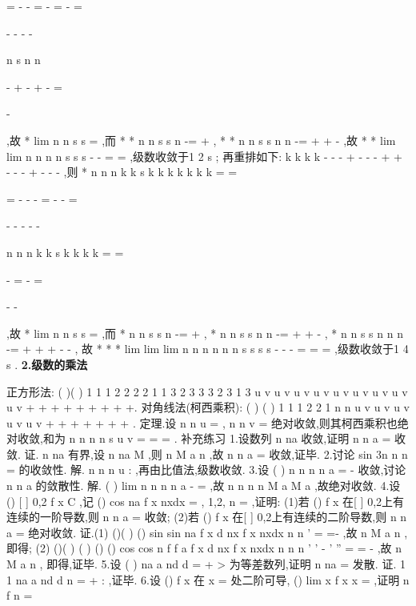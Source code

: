 =
-
-
=
-
=
-
=






-
-
-
-






\sum 
\sum 
\sum 
n
s
n
n


-
+
-
+
-
=


-


\Lambda 
,故
*
lim
n
n
s
s
\to \infty 
=
,而
*
*
n
n
s
s
n
-=
+
, 
*
*
n
n
s
s
n
n
-=
+
+
-
,故
*
*
lim
lim
n
n
n
n
s
s
s
-
-
\to \infty 
\to \infty 
=
=
,级数收敛于1
2 s ; 
再重排如下: 
k
k
k
k
-
-
-
+
-
-
-
+
+
-
-
-
+
-
-
-
\Lambda 
\Lambda ,则 
*
n
n
n
k
k
s
k
k
k
k
k
k
k
=
=




=
-
-
-
=
-
-
=




-
-
-
-
-




\sum 
\sum 
n
n
n
k
k
s
k
k
k
k
=
=




-
=
-
=




-
-




\sum 
\sum 
,故
*
lim
n
n
s
s
\to \infty 
=
,而 
*
n
n
s
s
n
-=
+
,
*
n
n
s
s
n
n
-=
+
+
-
,
*
n
n
s
s
n
n
n
-=
+
+
+
-
-
, 
故
*
*
*
lim
lim
lim
n
n
n
n
n
n
s
s
s
s
-
-
-
\to \infty 
\to \infty 
\to \infty 
=
=
=
,级数收敛于1
4 s . 
{\bfseries \textcolor{lyred}{2.级数的乘法}}

\textcolor{lyred}{正方形法}:
(
)(
)
1 1
1 2
2 2
2 1
1 3
2 3
3 3
2 3
1 3
u v
u v
u v
u v
u v
u v
u v
u v
u v
+
+
+
+
+
+
+
+
+\Lambda . 
\textcolor{lyred}{对角线法(柯西乘积)}:
(
)
(
)
1 1
1 2
2 1
n
n
u v
u v
u v
u v
u v
+
+
+
+
+
+
+
\Lambda 
\Lambda 
\Lambda . 
\textcolor{lyred}{定理}.设
n
n
u
\infty 
=\sum 
,
n
n
v
\infty 
=\sum 
绝对收敛,则其柯西乘积也绝对收敛,和为
n
n
n
n
s
u
v
\infty 
\infty 
=
=
=
\cdots 
\sum 
\sum 
. 
\textcolor{lyred}{补充练习 }
1.设数列
n
na 收敛,证明
n
n
a
\infty 
=\sum 
收敛. 
证.
n
na 有界,设
n
na
M
\le 
,则
n
M
a
n
\le 
,故
n
n
a
\infty 
=\sum 
收敛,证毕. 
2.讨论
sin 3n
n
n
\infty 
=\sum 
的收敛性. 
解.
n
n
n
u :
,再由比值法,级数收敛. 
3.设
(
)
n
n
n
n
a
\infty 
=
-
\sum 
收敛,讨论\sum 
{}
n
n
a 的敛散性. 
解.
(
)
lim
n
n
n
n
a
\to \infty -
=
,故
n
n
n
n
M
a
M
a
\le 
\Rightarrow 
\le 
,故绝对收敛. 
4.设
()
[
]
0,2
f x
C
\pi 
\in 
,记
()
cos
na
f x
nxdx
\pi 
=\int 
,
1,2,
n =
\Lambda ,证明: 
(1)若
()
f x 在[
]
0,2\pi 上有连续的一阶导数,则
n
n
a
\infty 
=\sum 
收敛; 
(2)若
()
f x 在[
]
0,2\pi 上有连续的二阶导数,则
n
n
a
\infty 
=\sum 
绝对收敛. 
证.(1)
()(
)
()
sin
sin
na
f x d
nx
f
x
nxdx
n
n
\pi 
\pi 
'
=
=-
\int 
\int 
,故
n
M
a
n
\le 
,即得; 
(2)
()(
)
(
)
()
()
cos
cos
n
f
f
a
f
x d
nx
f
x
nxdx
n
n
n
\pi 
\pi 
\pi 
'
'
-
'
''
=
=
-
\int 
\int 
,故
n
M
a
n
\le 
, 
即得,证毕. 
5.设
(
)
na
a
nd d
=
+
>
为等差数列,证明
n
na
\infty 
=\sum 
发散. 
证.
1 1
na
a
nd
d n
=
+
:
,证毕. 
6.设
()
f x 在
x =
处二阶可导,
()
lim
x
f x
x
\to 
=
,证明
n
f
n
\infty 
=






